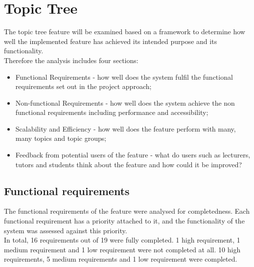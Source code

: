 \section{Topic Tree}

The topic tree feature will be examined based on a framework to determine how well the implemented feature has achieved its intended purpose and its functionality. \\

Therefore the analysis includes four sections:\\
\begin{itemize}
    \item Functional Requirements - how well does the system fulfil the functional requirements set out in the project approach;
    \item Non-functional Requirements - how well does the system achieve the non functional requirements including performance and accessibility;
    \item Scalability and Efficiency - how well does the feature perform with many, many topics and topic groups;
    \item Feedback from potential users of the feature - what do users such as lecturers, tutors and students think about the feature and how could it be improved?
\end{itemize}

\subsection{Functional requirements}
The functional requirements of the feature were analysed for completedness. Each functional requirement has a priority attached to it, and the functionality of the system was assessed against this priority. \\

In total, 16 requirements out of 19 were fully completed. 1 high requirement, 1 medium requirement and 1 low requirement were not completed at all. 10 high requirements, 5 medium requirements and 1 low requirement were completed. \\

